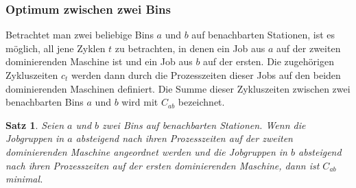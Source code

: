 \documentclass{scrreprt}
\newtheorem{satz}{Satz}
\begin{document}
\subsubsection{Optimum zwischen zwei Bins}
Betrachtet man zwei beliebige Bins $a$ und $b$ auf benachbarten Stationen, ist es möglich, 
all jene Zyklen $t$ zu betrachten, in denen ein Job aus $a$ auf der zweiten dominierenden Maschine ist und ein Job aus $b$ auf der ersten.
Die zugehörigen Zykluszeiten $c_t$ werden dann durch die Prozesszeiten dieser Jobs auf den beiden dominierenden Maschinen definiert.%
Die Summe dieser Zykluszeiten zwischen zwei benachbarten Bins $a$ und $b$ wird mit $C_{ab}$ bezeichnet.
\begin{satz}
    Seien $a$ und $b$ zwei Bins auf benachbarten Stationen.
    Wenn die Jobgruppen in $a$ absteigend nach ihren Prozesszeiten auf der zweiten dominierenden Maschine angeordnet werden
    und die Jobgruppen in $b$ absteigend nach ihren Prozesszeiten auf der ersten dominierenden Maschine,
    dann ist $C_{ab}$ minimal.
\end{satz}
\end{document}
